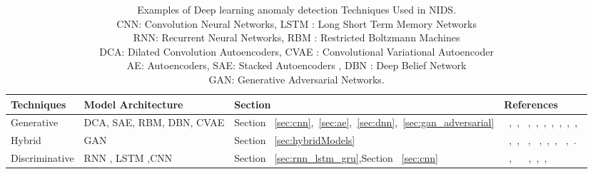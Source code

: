 \begin{table}
\begin{center}
  \caption{Examples of Deep learning anomaly detection Techniques Used in NIDS.
          \\CNN: Convolution Neural Networks, LSTM : Long Short Term Memory Networks
          \\RNN: Recurrent Neural Networks, RBM : Restricted Boltzmann Machines
          \\DCA: Dilated Convolution Autoencoders, CVAE : Convolutional Variational Autoencoder
          \\AE: Autoencoders, SAE: Stacked Autoencoders , DBN : Deep Belief Network
          \\GAN: Generative Adversarial Networks. }
  \label{tab:NIDS}
    \begin{tabular}{ | l | p{4cm} | l | p{5cm} |}
    \hline
    Techniques & Model Architecture & Section & References \\ \hline
   Generative  & DCA, SAE, RBM, DBN, CVAE & Section ~\ref{sec:cnn},~\ref{sec:ae},~\ref{sec:dnn},~\ref{sec:gan_adversarial} & ~\cite{yu2017network},~\cite{thing2017ieee}, ~\cite{zolotukhin2016increasing},~\cite{cordero2016analyzing},~\cite{alrawashdeh2016toward},~\cite{tang2016deep},~\cite{lopez2017conditional},~\cite{al2018deep},~\cite{mirsky2018kitsune},~\cite{aygun2017network} \\ \hline
  Hybrid  & GAN   & Section ~\ref{sec:hybridModels} & ~\cite{lin2018idsgan},~\cite{yin2018enhancing}, ~\cite{ring2018flow}, ~\cite{latah2018deep},~\cite{intrator2018mdgan},~\cite{matsubara2018anomaly},~\cite{nicolau2016hybrid} ,~\cite{rigaki2017adversarial}. \\ \hline
  Discriminative &  RNN , LSTM ,CNN & Section ~\ref{sec:rnn_lstm_gru},Section ~\ref{sec:cnn} & ~\cite{yu2017network}, ~\cite{malaiya2018empirical} ~\cite{kwon2018empirical},~\cite{gao2014intrusion},~\cite{staudemeyer2015applying},~\cite{naseer2018enhanced}\\
  \hline
  \end{tabular}
\end{center}
\end{table}


